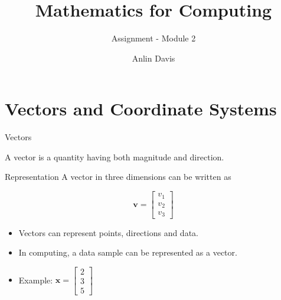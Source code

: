 \documentclass[aspectratio=169]{beamer}
\title{Mathematics for Computing}
\subtitle{Assignment -  Module 2}
\author{Anlin Davis}
\institute{M.Tech AI \& SE}
\date{}   %
\begin{document}
\begin{frame}
\titlepage
\end{frame}




\section{Vectors and Coordinate Systems}

\begin{frame}{Vectors}
\small

A vector is a quantity having both magnitude and direction.

\begin{block}{Representation}
A vector in three dimensions can be written as

$$
\mathbf{v}=
\begin{bmatrix}
v_1\\
v_2\\
v_3
\end{bmatrix}
$$

\end{block}

\begin{itemize}
\item Vectors can represent points, directions and data.
\item In computing, a data sample can be represented as a vector.
\item Example:
\(    \mathbf{x}=
    \begin{bmatrix}
    2\\
    3\\
    5
    \end{bmatrix}
   \)
\end{itemize}

\end{frame}
\end{document}
